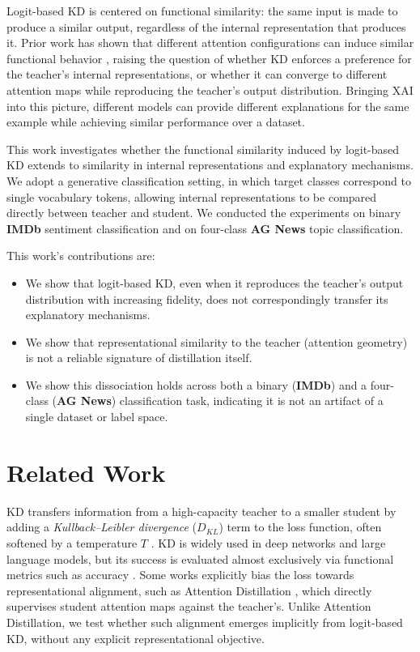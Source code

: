 \documentclass[conference]{IEEEtran}
\begin{document}
Logit-based KD is centered on functional similarity: the same input is made to produce a similar output, regardless of the internal representation that produces it. Prior work has shown that different attention configurations can induce similar functional behavior \cite{jain2019attention}, raising the question of whether KD enforces a preference for the teacher's internal representations, or whether it can converge to different attention maps while reproducing the teacher's output distribution. Bringing XAI into this picture, different models can provide different explanations for the same example while achieving similar performance over a dataset.

This work investigates whether the functional similarity induced by logit-based KD extends to similarity in internal representations and explanatory mechanisms. We adopt a generative classification setting, in which target classes correspond to single vocabulary tokens, allowing internal representations to be compared directly between teacher and student. We conducted the experiments on binary \textbf{IMDb} sentiment classification and on four-class \textbf{AG News} topic classification.

This work's contributions are:
\begin{itemize}
    \item We show that logit-based KD, even when it reproduces the teacher's output distribution with increasing fidelity, does not correspondingly transfer its explanatory mechanisms.
    \item We show that representational similarity to the teacher (attention geometry) is not a reliable signature of distillation itself.
    \item We show this dissociation holds across both a binary (\textbf{IMDb}) and a four-class (\textbf{AG News}) classification task, indicating it is not an artifact of a single dataset or label space.
\end{itemize}

\section{Related Work}

KD transfers information from a high-capacity teacher to a smaller student by adding a \textit{Kullback--Leibler divergence} ($D_{KL}$) term to the loss function, often softened by a temperature $T$ \cite{hinton2015distilling}. KD is widely used in deep networks and large language models, but its success is evaluated almost exclusively via functional metrics such as accuracy \cite{gou2021knowledge}. Some works explicitly bias the loss towards representational alignment, such as Attention Distillation \cite{zhou2025attention}, which directly supervises student attention maps against the teacher's. Unlike Attention Distillation, we test whether such alignment emerges implicitly from logit-based KD, without any explicit representational objective.
\end{document}
